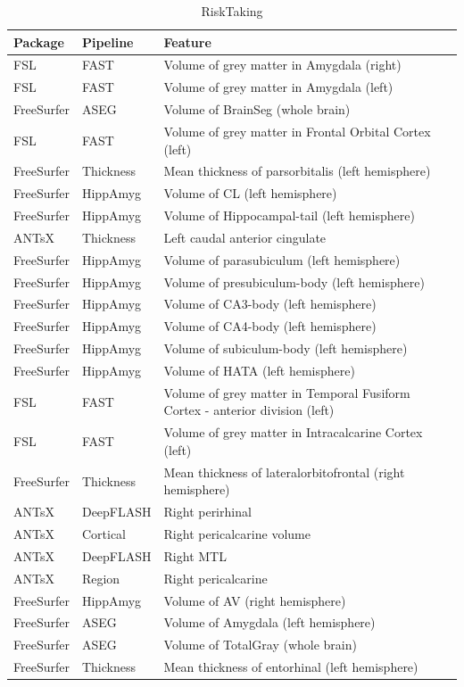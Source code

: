 \documentclass[
  10pt,
]{article}
\begin{document}
\begin{table}

\caption{\label{tab:compare-predictions}RiskTaking}
\centering
\begin{tabular}[t]{lll}
\toprule
Package & Pipeline & Feature\\
\midrule
FSL & FAST & Volume of grey matter in Amygdala (right)\\
FSL & FAST & Volume of grey matter in Amygdala (left)\\
FreeSurfer & ASEG & Volume of BrainSeg (whole brain)\\
FSL & FAST & Volume of grey matter in Frontal Orbital Cortex (left)\\
FreeSurfer & Thickness & Mean thickness of parsorbitalis (left hemisphere)\\
\addlinespace
FreeSurfer & HippAmyg & Volume of CL (left hemisphere)\\
FreeSurfer & HippAmyg & Volume of Hippocampal-tail (left hemisphere)\\
ANTsX & Thickness & Left caudal anterior cingulate\\
FreeSurfer & HippAmyg & Volume of parasubiculum (left hemisphere)\\
FreeSurfer & HippAmyg & Volume of presubiculum-body (left hemisphere)\\
\addlinespace
FreeSurfer & HippAmyg & Volume of CA3-body (left hemisphere)\\
FreeSurfer & HippAmyg & Volume of CA4-body (left hemisphere)\\
FreeSurfer & HippAmyg & Volume of subiculum-body (left hemisphere)\\
FreeSurfer & HippAmyg & Volume of HATA (left hemisphere)\\
FSL & FAST & Volume of grey matter in Temporal Fusiform Cortex - anterior division (left)\\
\addlinespace
FSL & FAST & Volume of grey matter in Intracalcarine Cortex (left)\\
FreeSurfer & Thickness & Mean thickness of lateralorbitofrontal (right hemisphere)\\
ANTsX & DeepFLASH & Right perirhinal\\
ANTsX & Cortical & Right pericalcarine volume\\
ANTsX & DeepFLASH & Right MTL\\
\addlinespace
ANTsX & Region & Right pericalcarine\\
FreeSurfer & HippAmyg & Volume of AV (right hemisphere)\\
FreeSurfer & ASEG & Volume of Amygdala (left hemisphere)\\
FreeSurfer & ASEG & Volume of TotalGray (whole brain)\\
FreeSurfer & Thickness & Mean thickness of entorhinal (left hemisphere)\\
\bottomrule
\end{tabular}
\end{table}
\end{document}
